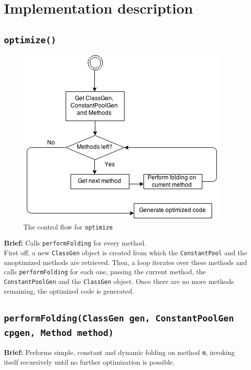 \section{Implementation description}
\label{sec:description}

\subsection{\texttt{optimize()}}
\begin{figure}[h!]
\centering
\includegraphics[scale=0.6]{figures/overview}
\caption{The control flow for \texttt{optimize}}
\label{fig:overview}
\end{figure}
\textbf{Brief: }Calls \texttt{performFolding} for every method.\\

First off, a new \texttt{ClassGen} object is created from which the \texttt{ConstantPool} and the unoptimized methods are retrieved. Then,  a loop iterates over these methods and calls \texttt{performFolding} for each one,  passing the current method, the \texttt{ConstantPoolGen} and the \texttt{ClassGen} object. Once there are no more methods remaining, the optimized code is generated.

\subsection{\texttt{performFolding(ClassGen gen, ConstantPoolGen cpgen, Method method)}}
\label{subsec:performfolding}
\textbf{Brief: }Performs simple, constant and dynamic folding on method \texttt{m}, invoking itself recursively until no further optimization is possible. \\


